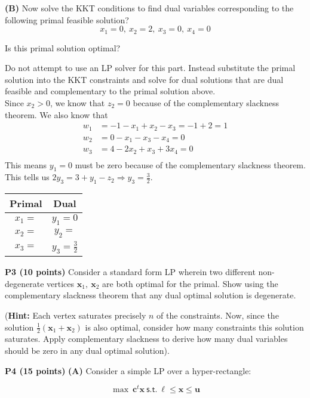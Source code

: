 \documentclass[11pt]{article}
\newcommand\vx {\mathbf{x}}
\begin{document}
\noindent\textbf{(B)} Now solve the KKT conditions to find  dual
variables corresponding to  the following primal feasible solution?
\[ x_1 = 0,\ x_2 = 2,\ x_3 = 0,\ x_4 = 0 \]

Is this primal solution optimal? 

Do not attempt to use an LP solver for this part. Instead substitute
the primal solution into the KKT constraints and solve for dual
solutions that are dual feasible and complementary to the primal
solution above.
\\
Since $x_2 > 0$, we know that $z_2 = 0$ because of the complementary slackness theorem.  We also know that 
\begin{align*}
w_1 & = -1 - x_1 + x_2 - x_3 = -1 + 2 = 1\\
w_2 & = 0 - x_1 - x_3 - x_4 = 0\\
w_3 & = 4 - 2x_2 + x_3 +3x_4 = 0\\
\end{align*}
This means $y_1 = 0$ must be zero because of the complementary slackness theorem.  This tells us $2y_3 = 3 + y_1 - z_2 \Rightarrow y_3 = \frac{3}{2}$.


\begin{tabular}{|c|c|}
\hline
Primal & Dual \\ \hline
$x_1 = $ & $y_1 = 0$ \\ \hline
$x_2 = $ & $y_2 = $ \\ \hline
$x_3 = $ & $y_3 = \frac{3}{2}$ \\ \hline
\end{tabular}

\bigskip

\noindent\textbf{P3 (10 points)} Consider a standard form LP wherein
two different non-degenerate vertices $\vx_1,\ \vx_2$ are both optimal for the primal. Show using the
complementary slackness theorem that any dual optimal solution
is degenerate.

(\textbf{Hint:} Each vertex saturates precisely $n$ of the
constraints. Now, since the solution $\frac{1}{2} (\vx_1 + \vx_2)$
is also optimal, consider how many constraints this solution
saturates. Apply complementary slackness to derive how many
dual variables should be zero in any dual optimal solution).

\bigskip

\noindent\textbf{P4 (15 points)} \noindent\textbf{(A)} Consider a
simple LP over a hyper-rectangle:

\[ \max\ \mathbf{c}^t \mathbf{x}\ \mathsf{s.t.}\ \ell \leq \mathbf{x}
\leq \mathbf{u} \]
\end{document}
